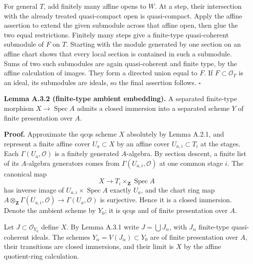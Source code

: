 \documentclass[11pt]{article}
\begin{document}
For general \(T\), add finitely many affine opens to \(W\). At a step,
their intersection with the already treated quasi-compact open is
quasi-compact. Apply the affine assertion to extend the given submodule
across that affine open, then glue the two equal restrictions. Finitely
many steps give a finite-type quasi-coherent submodule of \(F\) on
\(T\). Starting with the module generated by one section on an affine
chart shows that every local section is contained in such a submodule.
Sums of two such submodules are again quasi-coherent and finite type, by
the affine calculation of images. They form a directed union equal to
\(F\). If \(F\subset\mathcal O_T\) is an ideal, its submodules are
ideals, so the final assertion follows. \(\square\)

\textbf{Lemma A.3.2 (finite-type ambient embedding).} A separated
finite-type morphism \(X\to\operatorname{Spec}A\) admits a closed
immersion into a separated scheme \(Y\) of finite presentation over
\(A\).

\textbf{Proof.} Approximate the qcqs scheme \(X\) absolutely by Lemma
A.2.1, and represent a finite affine cover \(U_a\subset X\) by an affine
cover \(U_{a,i}\subset T_i\) at the stages. Each
\(\Gamma(U_a,\mathcal O)\) is a finitely generated \(A\)-algebra. By
section descent, a finite list of its \(A\)-algebra generators comes
from \(\Gamma(U_{a,i},\mathcal O)\) at one common stage \(i\). The
canonical map \[
X\longrightarrow T_i\times_{\mathbf Z}\operatorname{Spec}A
\] has inverse image of \(U_{a,i}\times\operatorname{Spec}A\) exactly
\(U_a\), and the chart ring map
\(A\otimes_{\mathbf Z}\Gamma(U_{a,i},\mathcal O)\to\Gamma(U_a,\mathcal O)\)
is surjective. Hence it is a closed immersion. Denote the ambient scheme
by \(Y_0\); it is qcqs and of finite presentation over \(A\).

Let \(J\subset\mathcal O_{Y_0}\) define \(X\). By Lemma A.3.1 write
\(J=\bigcup J_\alpha\), with \(J_\alpha\) finite-type quasi-coherent
ideals. The schemes \(Y_\alpha=V(J_\alpha)\subset Y_0\) are of finite
presentation over \(A\), their transitions are closed immersions, and
their limit is \(X\) by the affine quotient-ring calculation.
\end{document}
